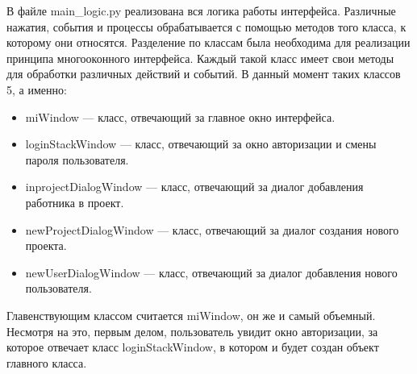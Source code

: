 



В файле main\_logic.py реализована вся логика работы интерфейса.
Различные нажатия, события и процессы обрабатывается с помощью методов того класса, к которому они относятся.
Разделение по классам была необходима для реализации принципа многооконного интерфейса.
Каждый такой класс имеет свои методы для обработки различных действий и событий. В данный момент таких классов 5, а именно:
\begin{itemize}
    \item miWindow --- класс, отвечающий за главное окно интерфейса.
    \item loginStackWindow --- класс, отвечающий за окно авторизации и смены пароля пользователя.
    \item inprojectDialogWindow --- класс, отвечающий за диалог добавления работника в проект.
    \item newProjectDialogWindow --- класс, отвечающий за диалог создания нового проекта.
    \item newUserDialogWindow --- класс, отвечающий за диалог добавления нового пользователя.
\end{itemize}

Главенствующим классом считается miWindow, он же и самый объемный. Несмотря на это, первым делом, пользователь увидит окно авторизации, 
за которое отвечает класс loginStackWindow, в котором и будет создан объект главного класса.


\clearpage
